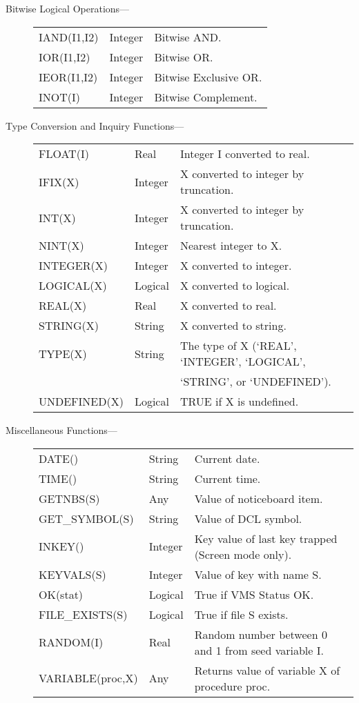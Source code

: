 \begin{description}
\item [Bitwise Logical Operations--- ]

\begin{tabular}{l l l}
IAND(I1,I2) & Integer & Bitwise AND. \\
IOR(I1,I2) & Integer & Bitwise OR. \\
IEOR(I1,I2) & Integer & Bitwise Exclusive OR. \\
INOT(I) & Integer & Bitwise Complement. \\
\end{tabular}

\item [Type Conversion and Inquiry Functions--- ]

\begin{tabular}{l l l}
FLOAT(I) & Real & Integer I converted to real. \\
IFIX(X) & Integer & X converted to integer by truncation. \\
INT(X) & Integer & X converted to integer by truncation. \\
NINT(X) & Integer & Nearest integer to X. \\
INTEGER(X) & Integer & X converted to integer. \\
LOGICAL(X) & Logical & X converted to logical. \\
REAL(X) & Real & X converted to real.\\
STRING(X) & String & X converted to string. \\
TYPE(X) & String & The type of X (`REAL', `INTEGER', `LOGICAL', \\
 & &`STRING', or `UNDEFINED'). \\
UNDEFINED(X) & Logical & TRUE if X is undefined. \\
\end{tabular}

\item [Miscellaneous Functions--- ]

\begin{tabular}{l l l}
DATE() & String & Current date. \\
TIME() & String & Current time. \\
GETNBS(S) & Any & Value of noticeboard item. \\
GET\_SYMBOL(S) & String & Value of DCL symbol. \\
INKEY() & Integer & Key value of last key trapped (Screen mode only). \\
KEYVALS(S) & Integer & Value of key with name S. \\
OK(stat) & Logical & True if VMS Status OK. \\
FILE\_EXISTS(S) & Logical & True if file S exists. \\
RANDOM(I) & Real & Random number between 0 and 1 from seed variable I. \\
VARIABLE(proc,X) & Any & Returns value of variable X of procedure proc.\\
\end{tabular}
\end{description}

